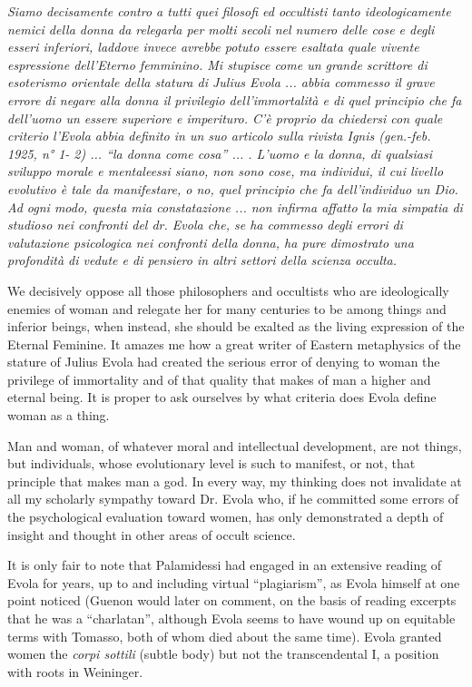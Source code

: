 \begin{quotationx}
\textit{Siamo decisamente contro a tutti quei filosofi ed occultisti tanto ideologicamente nemici della donna da relegarla per molti secoli nel numero delle cose e degli esseri inferiori, laddove invece avrebbe potuto essere esaltata quale vivente espressione dell'Eterno femminino. Mi stupisce come un grande scrittore di esoterismo orientale della statura di Julius Evola ... abbia commesso il grave errore di negare alla donna il privilegio dell'immortalità e di quel principio che fa dell'uomo un essere superiore e imperituro. C'è proprio da chiedersi con quale criterio l'Evola abbia definito in un suo articolo sulla rivista Ignis (gen.-feb. 1925, n° 1- 2) ... ``la donna come cosa'' ... . L'uomo e la donna, di qualsiasi sviluppo morale e mentaleessi siano, non sono cose, ma individui, il cui livello evolutivo è tale da manifestare, o no, quel principio che fa dell'individuo un Dio. Ad ogni modo, questa mia constatazione ... non infirma affatto la mia simpatia di studioso nei confronti del dr. Evola che, se ha commesso degli errori di valutazione psicologica nei confronti della donna, ha pure dimostrato una profondità di vedute e di pensiero in altri settori della scienza occulta.}

We decisively oppose all those philosophers and occultists who are ideologically enemies of woman and relegate her for many centuries to be among things and inferior beings, when instead, she should be exalted as the living expression of the Eternal Feminine. It amazes me how a great writer of Eastern metaphysics of the stature of Julius Evola had created the serious error of denying to woman the privilege of immortality and of that quality that makes of man a higher and eternal being. It is proper to ask ourselves by what criteria does Evola define woman as a thing.

Man and woman, of whatever moral and intellectual development, are not things, but individuals, whose evolutionary level is such to manifest, or not, that principle that makes man a god. In every way, my thinking does not invalidate at all my scholarly sympathy toward Dr. Evola who, if he committed some errors of the psychological evaluation toward women, has only demonstrated a depth of insight and thought in other areas of occult science.
\end{quotationx}


It is only fair to note that Palamidessi had engaged in an extensive reading of Evola for years, up to and including virtual ``plagiarism'', as Evola himself at one point noticed (Guenon would later on comment, on the basis of reading excerpts that he was a ``charlatan'', although Evola seems to have wound up on equitable terms with Tomasso, both of whom died about the same time). Evola granted women the \emph{corpi sottili} (subtle body) but not the transcendental I, a position with roots in Weininger.

